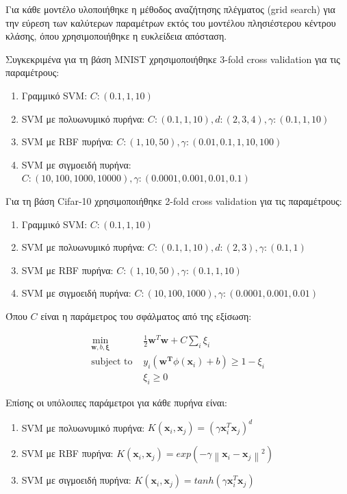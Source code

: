 \documentclass[a4paper]{article}
\newcommand{\norm}[1]{\left\lVert#1\right\rVert}
\begin{document}
Για κάθε μοντέλο υλοποιήθηκε η μέθοδος αναζήτησης πλέγματος (grid search) για
την εύρεση των καλύτερων παραμέτρων εκτός του μοντέλου πλησιέστερου κέντρου
κλάσης, όπου χρησιμοποιήθηκε η ευκλείδεια απόσταση.

Συγκεκριμένα για τη βάση MNIST χρησιμοποιήθηκε 3-fold cross validation για τις
παραμέτρους:

\begin{enumerate}
    \item Γραμμικό SVM: $C: (0.1, 1, 10)$
    \item SVM με πολυωνυμικό πυρήνα: $C: (0.1, 1, 10), d: (2, 3, 4), \gamma:
        (0.1, 1, 10)$
    \item SVM με RBF πυρήνα: $C: (1, 10, 50), \gamma: (0.01, 0.1, 1, 10, 100)$
    \item SVM με σιγμοειδή πυρήνα: $C: (10, 100, 1000, 10000), \gamma: (0.0001,
        0.001, 0.01, 0.1)$
\end{enumerate}

Για τη βάση Cifar-10 χρησιμοποιήθηκε 2-fold cross validation για τις
παραμέτρους:

\begin{enumerate}
    \item Γραμμικό SVM: $C: (0.1, 1, 10)$
    \item SVM με πολυωνυμικό πυρήνα: $C: (0.1, 1, 10), d: (2, 3), \gamma:
        (0.1, 1)$
    \item SVM με RBF πυρήνα: $C: (1, 10, 50), \gamma: (0.1, 1, 10)$
    \item SVM με σιγμοειδή πυρήνα: $C: (10, 100, 1000), \gamma: (0.0001, 0.001,
        0.01)$
\end{enumerate}

Όπου $C$ είναι η παράμετρος του σφάλματος από της εξίσωση:

\begin{equation*}
\begin{split}
    \min_{\bm{w},b,\bm{\xi}} & \frac{1}{2} \bm{w}^T\bm{w} + C \sum_{i} \xi_{i} \\
    \text{subject to } & y_i (\bm{w^T} \phi (\bm{x}_i) + b) \ge 1 - \xi_i \\
     & \xi_i \ge 0
\end{split}
\end{equation*}

Επίσης οι υπόλοιπες παράμετροι για κάθε πυρήνα είναι:

\begin{enumerate}
    \item SVM με πολυωνυμικό πυρήνα: $K(\bm{x}_i,\bm{x}_j) = (\gamma \bm{x}_i^T
        \bm{x}_j)^d$
    \item SVM με RBF πυρήνα: $K(\bm{x}_i,\bm{x}_j) = exp(-\gamma
        \norm{\bm{x}_i - \bm{x}_j}^2)$
    \item SVM με σιγμοειδή πυρήνα: $K(\bm{x}_i,\bm{x}_j) = tanh(\gamma
        \bm{x}_i^T \bm{x}_j)$
\end{enumerate}
\end{document}
